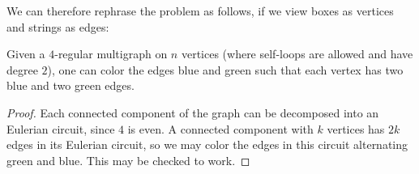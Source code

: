 We can therefore rephrase the problem as follows,
if we view boxes as vertices and strings as edges:
\begin{claim*}
  Given a $4$-regular multigraph on $n$ vertices
  (where self-loops are allowed and have degree $2$),
  one can color the edges blue and green
  such that each vertex has two blue and two green edges.
\end{claim*}
\begin{proof}
  Each connected component of the graph can be decomposed
  into an Eulerian circuit, since $4$ is even.
  A connected component with $k$ vertices has $2k$
  edges in its Eulerian circuit,
  so we may color the edges in this circuit alternating green and blue.
  This may be checked to work.
\end{proof}
